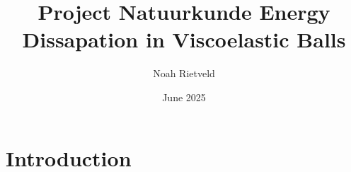 \documentclass{article}
\title{Project Natuurkunde Energy Dissapation in Viscoelastic Balls}
\author{Noah Rietveld}
\date{June 2025}
\begin{document}
\maketitle

\section{Introduction}
\end{document}
